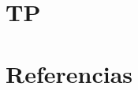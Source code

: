 \documentclass[a4paper,10pt]{article}
\begin{document}
\maketitle
\tableofcontents

\newpage
\section{TP}


\newpage
\section{Referencias}

\end{document}

